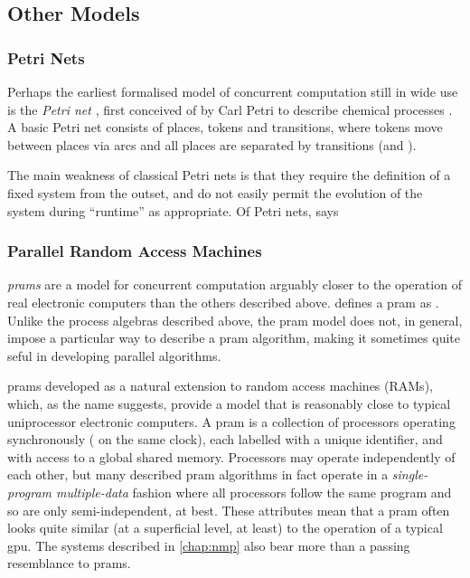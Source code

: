 \subsection{\label{sec:back:othermodels}Other Models}

\subsubsection{Petri Nets}
Perhaps the earliest formalised model of concurrent computation still in wide use is the \emph{Petri net} \cite{Dennis2011}, first conceived of by Carl Petri to describe chemical processes \cite{Petri2008}.  A basic Petri net consists of places, tokens and transitions, where tokens move between places via arcs and all places are separated by transitions (and \viceversa).

The main weakness of classical Petri nets is that they require the definition of a fixed system from the outset, and do not easily permit the evolution of the system during ``runtime'' as appropriate.  Of Petri nets, \citeauthor{Varela2013} says 

\subsubsection{\label{sec:back:pram}Parallel Random Access Machines}

\emph{\Glspl{pram}} are a model for concurrent computation arguably closer to the operation of real electronic computers than the others described above.  \citeauthor{JaJa2011} defines a \gls{pram} as .  Unlike the process algebras described above, the \gls{pram} model does not, in general, impose a particular way to describe a \gls{pram} algorithm, making it sometimes quite seful in developing parallel algorithms.

\Glspl{pram} developed as a natural extension to random access machines (RAMs), which, as the name suggests, provide a model that is reasonably close to typical uniprocessor electronic computers.  A \gls{pram} is a collection of processors operating synchronously (\ie{} on the same clock), each labelled with a unique identifier, and with access to a global shared memory.  Processors may operate independently of each other, but many described \gls{pram} algorithms in fact operate in a \emph{single-program multiple-data} fashion where all processors follow the same program and so are only semi-independent, at best.  These attributes mean that a \gls{pram} often looks quite similar (at a superficial level, at least) to the operation of a typical \gls{gpu}.  The systems described in \cref{chap:nmp} also bear more than a passing resemblance to \glspl{pram}.